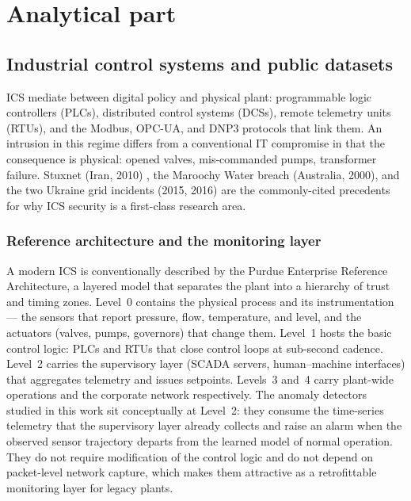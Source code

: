 \chapter{Analytical part}
\label{ch:background}

\section{Industrial control systems and public datasets}

ICS mediate between digital policy and physical plant: programmable logic controllers (PLCs), distributed control systems (DCSs), remote telemetry units (RTUs), and the Modbus, OPC-UA, and DNP3 protocols that link them.  An intrusion in this regime differs from a conventional IT compromise in that the consequence is physical: opened valves, mis-commanded pumps, transformer failure.  Stuxnet (Iran, 2010) \cite{langner2013stuxnet}, the Maroochy Water breach (Australia, 2000), and the two Ukraine grid incidents (2015, 2016) \cite{ukraine2016analysis} are the commonly-cited precedents for why ICS security is a first-class research area.

\subsection{Reference architecture and the monitoring layer}

A modern ICS is conventionally described by the Purdue Enterprise Reference Architecture, a layered model that separates the plant into a hierarchy of trust and timing zones.  Level~0 contains the physical process and its instrumentation --- the sensors that report pressure, flow, temperature, and level, and the actuators (valves, pumps, governors) that change them.  Level~1 hosts the basic control logic: PLCs and RTUs that close control loops at sub-second cadence.  Level~2 carries the supervisory layer (SCADA servers, human--machine interfaces) that aggregates telemetry and issues setpoints.  Levels~3 and~4 carry plant-wide operations and the corporate network respectively.  The anomaly detectors studied in this work sit conceptually at Level~2: they consume the time-series telemetry that the supervisory layer already collects and raise an alarm when the observed sensor trajectory departs from the learned model of normal operation.  They do not require modification of the control logic and do not depend on packet-level network capture, which makes them attractive as a retrofittable monitoring layer for legacy plants.

